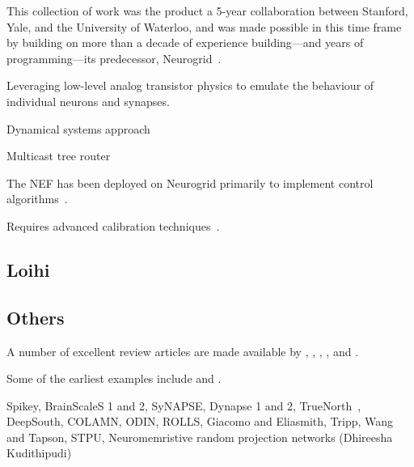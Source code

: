 This collection of work was the product a 5-year collaboration between Stanford, Yale, and the University of Waterloo, and was made possible in this time frame 
by building on more than a decade of experience building---and years of programming---its predecessor, Neurogrid~\citep{neurogrid2014}. 

Leveraging low-level analog transistor physics to emulate the behaviour of individual neurons and synapses.

Dynamical systems approach \citep{arthur2011silicon}

Multicast tree router \citep{merolla2014multicast}

The NEF has been deployed on Neurogrid primarily to implement control algorithms~\citep{dethier2011brain, choudhary2012silicon, menon2014controlling}.

Requires advanced calibration techniques~\citep{kauderer2017calibrating}.

\subsection{Loihi}

\citep{blouw2018a}

\subsection{Others}
\label{sec:neuromorphic-others}

A number of excellent review articles are made available by \citet{bartolozzi1999neuromorphic}, \citet{indiveri2011neuromorphic}, \citet{cassidy2013design}, \citet{eryilmaz2016neuromorphic}, and \citet{cummings2018}.

Some of the earliest examples include \citep{sivilotti1985novel, boahen1989heteroassociative} and \citep{mead1988silicon}.

Spikey, BrainScaleS 1 and 2, SyNAPSE, Dynapse 1 and 2, TrueNorth~\citep{merolla2014million, fischl2018}, DeepSouth, COLAMN, ODIN, ROLLS, Giacomo and Eliasmith, Tripp, Wang and Tapson, STPU, Neuromemristive random projection networks (Dhireesha Kudithipudi)

